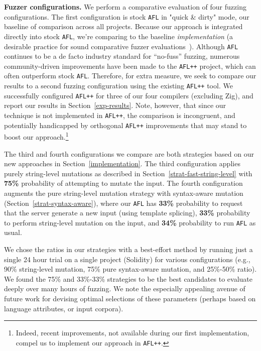 \noindent \textbf{Fuzzer configurations.} We perform a comparative evaluation
of four fuzzing configurations.  The first configuration is stock \texttt{AFL}
in "quick \& dirty" mode, our baseline of comparison across all projects.
Because our approach is integrated directly into stock \texttt{AFL}, we're
comparing to the baseline \emph{implementation} (a desirable practice for sound
comparative fuzzer evaluations~\cite{BoehmeCR21}).
Although \texttt{AFL} continues to be a de facto industry standard for
``no-fuss'' fuzzing, numerous community-driven improvements have been made to
the \texttt{AFL++} project, which can often outperform stock \texttt{AFL}.
Therefore, for extra measure, we seek to compare our results to a second
fuzzing configuration using the existing \texttt{AFL++} tool. We successfully
configured \texttt{AFL++} for three of our four compilers (excluding Zig), and
report our results in Section~\ref{exp-results}.  Note, however, that since our
technique is not implemented in \texttt{AFL++}, the comparison is incongruent,
and potentially handicapped by orthogonal \texttt{AFL++} improvements that may
stand to boost our approach.\footnote{Indeed, recent improvements, not
available during our first implementation, compel us to implement our approach
in \texttt{AFL++}.}

The third and fourth configurations we compare are both strategies based on our
new approaches in Section~\ref{implementation}. The third configuration applies
purely string-level mutations as described in
Section~\ref{strat-fast-string-level} with \textbf{75\%} probability of
attempting to mutate the input. The fourth configuration augments the pure
string-level mutation strategy with syntax-aware mutation
(Section~\ref{strat-syntax-aware}), where our \texttt{AFL} has \textbf{33\%}
probability to request that the server generate a new input (using template
splicing), \textbf{33\%} probability to perform string-level mutation on the
input, and \textbf{34\%} probability to run \texttt{AFL} as usual.

We chose the ratios in our strategies with a best-effort method by running just
a single 24 hour trial on a single project (Solidity) for various
configurations (e.g., 90\% string-level mutation, 75\% pure syntax-aware
mutation, and 25\%-50\% ratio). We found the 75\% and 33\%-33\% strategies
to be the best candidates to evaluate deeply over many hours of fuzzing. We
note the especially appealing avenue of future work for devising optimal
selections of these parameters (perhaps based on language attributes, or input
corpora).

